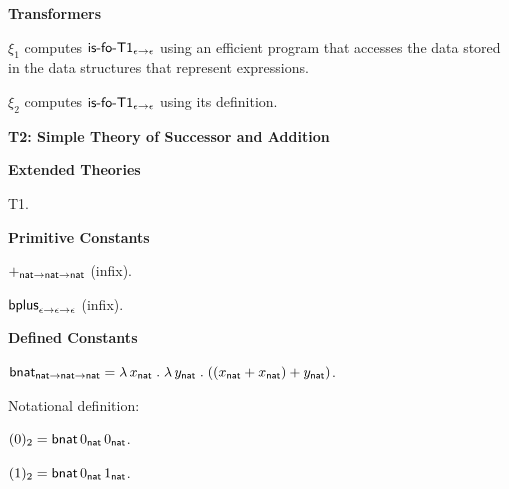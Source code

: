 \documentclass[fleqn,11pt]{article}
\begin{document}
  \item[] \textbf{Transformers}

  \be

    \item $\xi_1$ computes $\mbox{\sf is-fo-T1}_{\epsilon \rightarrow
      \epsilon}$ using an efficient program that accesses the data
      stored in the data structures that represent expressions.

    \item $\xi_2$ computes $\mbox{\sf is-fo-T1}_{\epsilon \rightarrow
      \epsilon}$ using its definition.

  \ee

\ei

\noindent
\textbf{T2: Simple Theory of Successor and Addition}

\bi

  \item[] \textbf{Extended Theories} 

  \be

    \item T1.

  \ee


  \item[] \textbf{Primitive Constants}

  \be

    \setcounter{enumi}{2}

    \item $+_{{\sf nat} \rightarrow {\sf nat} \rightarrow {\sf nat}}$ (infix).

    \item $\mbox{\sf bplus}_{\epsilon \rightarrow \epsilon \rightarrow \epsilon}$ (infix).

  \ee

  \item[] \textbf{Defined Constants}

  \be

    \setcounter{enumi}{2}

    \item $\mbox{\sf bnat}_{{\sf nat} \rightarrow {\sf nat} \rightarrow {\sf
        nat}} = \lambda\, x_{\sf nat} \mathrel. \lambda\, y_{\sf nat}
      \mathrel. ((x_{\sf nat} + x_{\sf nat}) + y_{\sf nat})$.
      
    Notational definition:

    \bi

      \item[] $(0)_2 = \mbox{\sf bnat} \, 0_{\sf nat} \, 0_{\sf nat}$.
  
      \item[] $(1)_2 = \mbox{\sf bnat} \, 0_{\sf nat} \, 1_{\sf nat}$.
  
\end{document}

